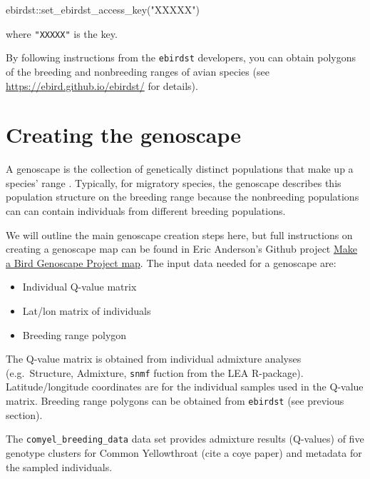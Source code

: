 \documentclass[
]{book}
\newenvironment{Shaded}{\begin{snugshade}}{\end{snugshade}}
\newcommand{\FunctionTok}[1]{\textcolor[rgb]{0.00,0.00,0.00}{#1}}
\newcommand{\NormalTok}[1]{#1}
\newcommand{\SpecialCharTok}[1]{\textcolor[rgb]{0.00,0.00,0.00}{#1}}
\newcommand{\StringTok}[1]{\textcolor[rgb]{0.31,0.60,0.02}{#1}}
\providecommand{\tightlist}{%
  \setlength{\itemsep}{0pt}\setlength{\parskip}{0pt}}
\begin{document}
\begin{Shaded}
\begin{Highlighting}[]
\NormalTok{ebirdst}\SpecialCharTok{::}\FunctionTok{set\_ebirdst\_access\_key}\NormalTok{(}\StringTok{"XXXXX"}\NormalTok{)}
\end{Highlighting}
\end{Shaded}

where \texttt{"XXXXX"} is the key.

By following instructions from the \texttt{ebirdst} developers, you can obtain polygons of the breeding and nonbreeding ranges of avian species (see \url{https://ebird.github.io/ebirdst/} for details).

\hypertarget{creating-the-genoscape}{%
\section{Creating the genoscape}\label{creating-the-genoscape}}

A genoscape is the collection of genetically distinct populations that make up a species' range \citep{ruegg2021american}. Typically, for migratory species, the genoscape describes this population structure on the breeding range because the nonbreeding populations can can contain individuals from different breeding populations.

We will outline the main genoscape creation steps here, but full instructions on creating a genoscape map can be found in Eric Anderson's Github project \href{https://github.com/eriqande/make-a-BGP-map}{Make a Bird Genoscape Project map}. The input data needed for a genoscape are:

\begin{itemize}
\tightlist
\item
  Individual Q-value matrix
\item
  Lat/lon matrix of individuals
\item
  Breeding range polygon
\end{itemize}

The Q-value matrix is obtained from individual admixture analyses (e.g.~Structure, Admixture, \texttt{snmf} fuction from the LEA R-package). Latitude/longitude coordinates are for the individual samples used in the Q-value matrix. Breeding range polygons can be obtained from \texttt{ebirdst} (see previous section).

The \texttt{comyel\_breeding\_data} data set provides admixture results (Q-values) of five genotype clusters for Common Yellowthroat (cite a coye paper) and metadata for the sampled individuals.
\end{document}
